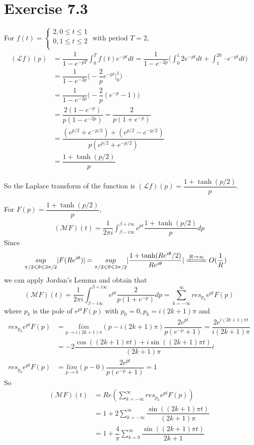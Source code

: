 \documentclass[a4paper,12pt,titlepage]{article}
\begin{document}
\section*{Exercise 7.3}
For $f(t)=\left\{
\begin{aligned}
2,0\leqslant t\leqslant1\\
0,1\leqslant t\leqslant2\\
\end{aligned}
\right.
$ with period $T=2$,
\begin{align*}
(\mathcal{L}f)(p)&=\dfrac{1}{1-e^{-pT}}\int_{0}^{T}f(t)e^{-pt}dt=\dfrac{1}{1-e^{-2p}}\Big(\int_{0}^{1}2e^{-pt}dt+\int_1^20\cdot e^{-pt}dt\Big)\\
&=\dfrac{1}{1-e^{-2p}}\Big(-\dfrac{2}{p}e^{-pt}|_{0}^{1}\Big)\\
&=\dfrac{1}{1-e^{-2p}}\Big(-\dfrac{2}{p}(e^{-p}-1)\Big)\\
&=\dfrac{2(1-e^{-p})}{p(1-e^{-2p})}=\dfrac{2}{p(1+e^{-p})}\\
&=\dfrac{(e^{p/2}+e^{-p/2})+(e^{p/2}-e^{-p/2})}{p(e^{p/2}+e^{-p/2})}\\
&=\dfrac{1+\tanh(p/2)}{p}
\end{align*}

So the Laplace transform of the function
is $(\mathcal{L}f)(p)=\dfrac{1+\tanh(p/2)}{p}$.

For $F(p)=\dfrac{1+\tanh(p/2)}{p}$, 
\begin{align*}
(\mathcal{M}F)(t)=\dfrac{1}{2\pi i}\int_{\beta-i\infty}^{\beta+i\infty}e^{pt}\dfrac{1+\tanh(p/2)}{p}dp
\end{align*}
Since
\begin{align*}
\underset{\pi/2\leqslant\theta\leqslant3\pi/2}{sup}|F(Re^{i\theta})|&=\underset{\pi/2\leqslant\theta\leqslant3\pi/2}{sup}|\dfrac{1+\tanh(Re^{i\theta}/2)}{Re^{i\theta}}|\xlongequal{R\rightarrow\infty} O(\dfrac{1}{R})
\end{align*}
we can apply Jordan's Lemma and obtain that
$$(\mathcal{M}F)(t)=\dfrac{1}{2\pi i}\int_{\beta-i\infty}^{\beta+i\infty}e^{pt}\dfrac{2}{p(1+e^{-p})}dp=\sum\limits_{k=-\infty}^{\infty}res_{p_k}e^{pt}F(p)$$
where $p_k$ is the pole of $e^{pt}F(p)$ with $p_0=0,p_k=i(2k+1)\pi$ and 
\begin{align*}
res_{p_k}e^{pt}F(p)&=\underset{p\rightarrow i(2k+1)\pi}{lim}(p-i(2k+1)\pi)\dfrac{2e^{pt}}{p(e^{-p}+1)}=\dfrac{2e^{i(2k+1)\pi t}}{i(2k+1)\pi}\\
&=-2\dfrac{\cos((2k+1)\pi t)+i\sin((2k+1)\pi t)}{(2k+1)\pi}i\\
res_{p_0}e^{pt}F(p)&=\underset{p\rightarrow 0}{lim}(p-0)\dfrac{2e^{pt}}{p(e^{-p}+1)}=1
\end{align*}
So
\begin{align*}
(\mathcal{M}F)(t)&=Re(\sum\limits_{k=-\infty}^{\infty}res_{p_k}e^{pt}F(p))\\
&=1+2\sum\limits_{k=-\infty}^{\infty}\dfrac{\sin((2k+1)\pi t)}{(2k+1)\pi}\\
&=1+\dfrac{4}{\pi}\sum\limits_{k=0}^{\infty}\dfrac{\sin((2k+1)\pi t)}{2k+1}
\end{align*}
\end{document}
